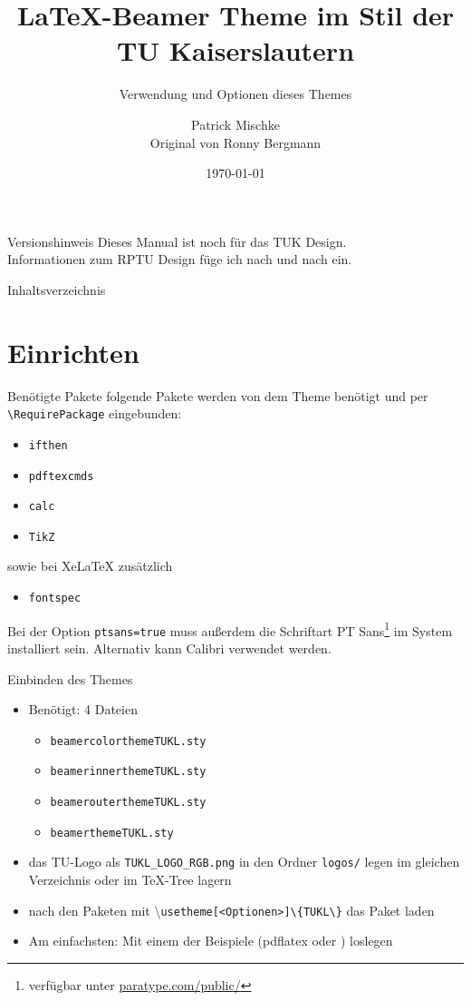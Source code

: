 \documentclass[german,10pt,xcolor=colortbl,compress
]{beamer}
\title{\LaTeX-Beamer Theme im Stil der TU Kaiserslautern}
\subtitle{Verwendung und Optionen dieses Themes}
\date[]{\today}
\author[P. Mischke]{Patrick Mischke\\Original von Ronny Bergmann}
\institute[]{AG Ott\\FB Physik\\RPTU Kaiserslautern}
\begin{document}
\begin{frame}{Versionshinweis}
	Dieses Manual ist noch für das TUK Design. \\
	Informationen zum RPTU Design füge ich nach und nach ein.
\end{frame}
\maketitle
\begin{frame}{Inhaltsverzeichnis}
	\tableofcontents
\end{frame}
\section{Einrichten}
\begin{frame}[fragile]{Benötigte Pakete}
	folgende Pakete werden von dem Theme benötigt und per \lstinline!\RequirePackage! eingebunden:
	\begin{itemize}
		\item \lstinline!ifthen!
		\item \lstinline!pdftexcmds!
		\item \lstinline!calc!
		\item \lstinline!TikZ!
	\end{itemize}\vspace{\baselineskip}
	sowie bei XeLaTeX zusätzlich
	\begin{itemize}
		\item \lstinline!fontspec!
	\end{itemize}\vspace{\baselineskip}
	Bei der Option \lstinline!ptsans=true! muss außerdem die Schriftart PT Sans\footnote{verfügbar unter \href{http://www.paratype.com/public/}{paratype.com/public/}} im System installiert sein. Alternativ kann Calibri verwendet werden.
\end{frame}
\begin{frame}{Einbinden des Themes}
	\begin{itemize}
		\item Benötigt: 4 Dateien
		      \begin{itemize}
			      \item \lstinline|beamercolorthemeTUKL.sty|
			      \item \lstinline|beamerinnerthemeTUKL.sty|
			      \item \lstinline!beamerouterthemeTUKL.sty!
			      \item \lstinline|beamerthemeTUKL.sty|
		      \end{itemize}
		\item das TU-Logo als \lstinline!TUKL_LOGO_RGB.png! in den Ordner \lstinline!logos/! legen
		      im gleichen Verzeichnis oder im \TeX-Tree lagern
		\item nach den Paketen mit \textbackslash\lstinline|usetheme[<Optionen>]\{TUKL\}| das Paket laden
		\item Am einfachsten: Mit einem der Beispiele (pdflatex oder \XeLaTeX) loslegen
	\end{itemize}
\end{frame}
\end{document}
